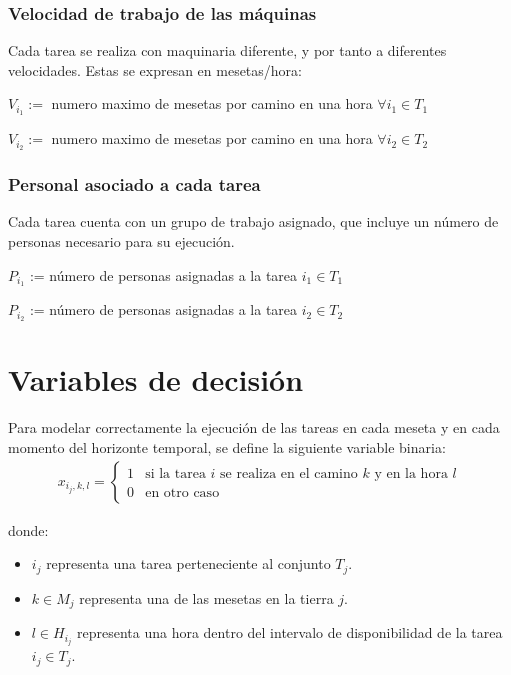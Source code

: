 \subsubsection{Velocidad de trabajo de las máquinas}

Cada tarea se realiza con maquinaria diferente, y por tanto a diferentes velocidades. Estas se expresan en mesetas/hora:
\begin{center}
$V_{i_1}:=$ numero maximo de mesetas por camino en una hora $\forall i_1 \in T_1$

$V_{i_2}:=$ numero maximo de mesetas por camino en una hora $\forall i_2 \in T_2$
\end{center}



\subsubsection{Personal asociado a cada tarea}
Cada tarea cuenta con un grupo de trabajo asignado, que incluye un número de personas necesario para su ejecución.
\begin{center}
    $P_{i_1}$ := número de personas asignadas a la tarea $i_1 \in T_1$

    $P_{i_2}$ := número de personas asignadas a la tarea $i_2 \in T_2$    
\end{center}

\section*{Variables de decisión}
Para modelar correctamente la ejecución de las tareas en cada meseta y en cada momento del horizonte temporal, se define la siguiente variable binaria:
\[\begin{aligned}
    x_{i_j,k,l} = \begin{cases} 1 & \text{si la tarea } i \text{ se realiza en el camino } k \text{ y en la hora } l \\ 0 & \text{en otro caso} \end{cases}
\end{aligned}\]

donde:
\begin{itemize}
    \item $i_j$ representa una tarea perteneciente al conjunto $T_j$.
    \item $k \in M_j$ representa una de las mesetas en la tierra $j$.
    \item $l \in H_{i_j}$ representa una hora dentro del intervalo de disponibilidad de la tarea $i_j \in T_j$.
\end{itemize}

